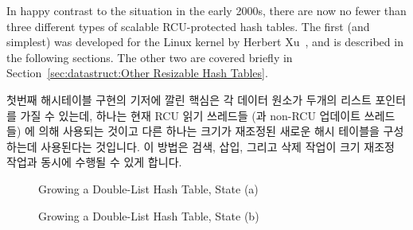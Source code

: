 In happy contrast to the situation in the early 2000s, there are now
no fewer than three different types of scalable RCU-protected hash
tables.
The first (and simplest) was developed for the Linux kernel by
Herbert Xu~\cite{HerbertXu2010RCUResizeHash}, and is described in the
following sections.
The other two are covered briefly in
Section~\ref{sec:datastruct:Other Resizable Hash Tables}.
\fi

첫번째 해시테이블 구현의 기저에 깔린 핵심은 각 데이터 원소가 두개의 리스트
포인터를 가질 수 있는데, 하나는 현재 RCU 읽기 쓰레드들 (과 non-RCU 업데이트
쓰레드들) 에 의해 사용되는 것이고 다른 하나는 크기가 재조정된 새로운 해시
테이블을 구성하는데 사용된다는 것입니다.
이 방법은 검색, 삽입, 그리고 삭제 작업이 크기 재조정 작업과 동시에 수행될 수
있게 합니다.

\begin{figure}[tb]
\centering
{}
\caption{Growing a Double-List Hash Table, State (a)}
\label{fig:datastruct:Growing a Double-List Hash Table, State (a)}
\end{figure}

\begin{figure}[tb]
\centering
{}
\caption{Growing a Double-List Hash Table, State (b)}
\label{fig:datastruct:Growing a Double-List Hash Table, State (b)}
\end{figure}

